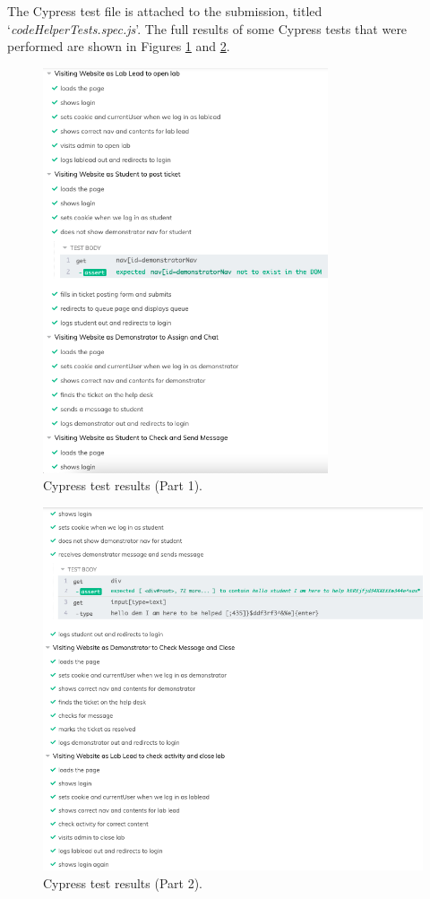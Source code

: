 The Cypress test file is attached to the submission, titled `\textit{codeHelperTests.spec.js}'. The full results of some Cypress tests that were performed are shown in Figures \ref{fig:cyp1} and \ref{fig:cyp2}.

\begin{figure}[H]
    \centering
    \includegraphics[width=0.75\textwidth]{9testing/images/cypress1.png}
    \caption{Cypress test results (Part 1).}
    \label{fig:cyp1}
\end{figure}

\begin{figure}[H]
    \centering
    \includegraphics[width=\textwidth]{9testing/images/cypress2.png}
    \caption{Cypress test results (Part 2).}
    \label{fig:cyp2}
\end{figure}

